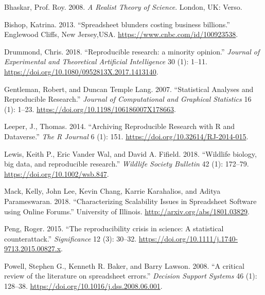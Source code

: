 \documentclass[smallextended]{svjour3}       %
\newlength{\cslhangindent}
\newlength{\cslentryspacingunit} %
\newenvironment{CSLReferences}[2] %
 {%
  \setlength{\parindent}{0pt}
  \ifodd #1
  \let\oldpar\par
  \def\par{\hangindent=\cslhangindent\oldpar}
  \fi
  \setlength{\parskip}{#2\cslentryspacingunit}
 }%
 {}
\begin{document}
\hypertarget{refs}{}
\begin{CSLReferences}{1}{0}
\leavevmode{}%
Bhaskar, Prof. Roy. 2008. \emph{{A Realist Theory of Science}}. London, UK: Verso.

\leavevmode{}%
Bishop, Katrina. 2013. {``{Spreadsheet blunders costing business billions}.''} Englewood Cliffs, New Jersey,USA. \url{https://www.cnbc.com/id/100923538}.

\leavevmode{}%
Drummond, Chris. 2018. {``{Reproducible research: a minority opinion}.''} \emph{Journal of Experimental and Theoretical Artificial Intelligence} 30 (1): 1--11. \url{https://doi.org/10.1080/0952813X.2017.1413140}.

\leavevmode{}%
Gentleman, Robert, and Duncan Temple Lang. 2007. {``{Statistical Analyses and Reproducible Research}.''} \emph{Journal of Computational and Graphical Statistics} 16 (1): 1--23. \url{https://doi.org/10.1198/106186007X178663}.

\leavevmode{}%
Leeper, J., Thomas. 2014. {``{Archiving Reproducible Research with R and Dataverse}.''} \emph{The R Journal} 6 (1): 151. \url{https://doi.org/10.32614/RJ-2014-015}.

\leavevmode{}%
Lewis, Keith P., Eric Vander Wal, and David A. Fifield. 2018. {``{Wildlife biology, big data, and reproducible research}.''} \emph{Wildlife Society Bulletin} 42 (1): 172--79. \url{https://doi.org/10.1002/wsb.847}.

\leavevmode{}%
Mack, Kelly, John Lee, Kevin Chang, Karrie Karahalios, and Aditya Parameswaran. 2018. {``{Characterizing Scalability Issues in Spreadsheet Software using Online Forums}.''} University of Illinois. \url{http://arxiv.org/abs/1801.03829}.

\leavevmode{}%
Peng, Roger. 2015. {``{The reproducibility crisis in science: A statistical counterattack}.''} \emph{Significance} 12 (3): 30--32. \url{https://doi.org/10.1111/j.1740-9713.2015.00827.x}.

\leavevmode{}%
Powell, Stephen G., Kenneth R. Baker, and Barry Lawson. 2008. {``{A critical review of the literature on spreadsheet errors}.''} \emph{Decision Support Systems} 46 (1): 128--38. \url{https://doi.org/10.1016/j.dss.2008.06.001}.


\end{CSLReferences}
\end{document}
